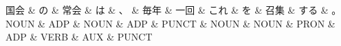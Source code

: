 \documentclass[tikz,border=5pt]{standalone}
\begin{document}
\normalsize
\begin{dependency}[edge unit distance=12.0pt]
    \begin{deptext}[column sep=1em]
        国会 \& の \& 常会 \& は \& 、 \& 毎年 \& 一回 \& これ \& を \& 召集 \& する \& 。\\
        NOUN \& ADP \& NOUN \& ADP \& PUNCT \& NOUN \& NOUN \& PRON \& ADP \& VERB \& AUX \& PUNCT\\
    \end{deptext}
\end{dependency}
\end{document}
